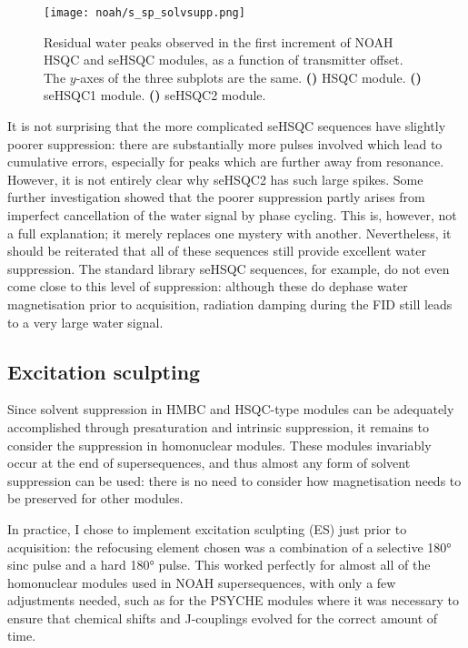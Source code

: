 \begin{figure}[!ht]
    \centering
    \texttt{[image: noah/s\_sp\_solvsupp.png]}%
    {\label{fig:s_sp_solvsupp_s}}%
    {\label{fig:s_sp_solvsupp_spv1}}%
    {\label{fig:s_sp_solvsupp_spv2}}%
    \caption[Comparison of solvent suppression in HSQC and seHSQC modules]{
        Residual water peaks observed in the first increment of NOAH HSQC and seHSQC modules, as a function of transmitter offset.
        The $y$-axes of the three subplots are the same.
        \textbf{()} HSQC module.
        \textbf{()} seHSQC1 module.
        \textbf{()} seHSQC2 module.
    }
    \label{fig:s_sp_solvsupp}
\end{figure}

It is not surprising that the more complicated seHSQC sequences have slightly poorer suppression: there are substantially more pulses involved which lead to cumulative errors, especially for peaks which are further away from resonance.
However, it is not entirely clear why seHSQC2 has such large spikes.
Some further investigation showed that the poorer suppression partly arises from imperfect cancellation of the water signal by phase cycling.
This is, however, not a full explanation; it merely replaces one mystery with another.
Nevertheless, it should be reiterated that all of these sequences still provide excellent water suppression.
The standard library seHSQC sequences, for example, do not even come close to this level of suppression: although these do dephase water magnetisation prior to acquisition, radiation damping during the FID still leads to a very large water signal.


\subsection{Excitation sculpting}

Since solvent suppression in HMBC and HSQC-type modules can be adequately accomplished through presaturation and intrinsic suppression, it remains to consider the suppression in homonuclear modules.
These modules invariably occur at the end of supersequences, and thus almost any form of solvent suppression can be used: there is no need to consider how magnetisation needs to be preserved for other modules.

In practice, I chose to implement excitation sculpting\autocite{Hwang1995JMRSA} (ES) just prior to acquisition: the refocusing element chosen was a combination of a selective \ang{180} sinc pulse and a hard \ang{180} pulse.
This worked perfectly for almost all of the homonuclear modules used in NOAH supersequences, with only a few adjustments needed, such as for the PSYCHE modules where it was necessary to ensure that chemical shifts and J-couplings evolved for the correct amount of time.

